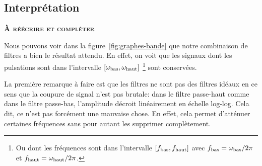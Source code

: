 \subsection{Interprétation}

\textbf{\textsc{À réécrire et compléter}}

Nous pouvons voir dans la figure~\ref{fig:graphes-bande}
que notre combinaison de filtres a bien le résultat attendu.
En effet, on voit que les signaux dont les pulsations sont dans l'intervalle
$[\omega_{\mathrm{bas}},\omega_{\mathrm{haut}}]$
\footnote{Ou dont les fréquences sont dans l'intervalle
    $[f_{\mathrm{bas}},f_{\mathrm{haut}}]$ avec
    $f_{\mathrm{bas}} = \omega_{\mathrm{bas}}/2\pi$ et
    $f_{\mathrm{haut}} = \omega_{\mathrm{haut}}/2\pi$.}
sont conservées.

La première remarque à faire est que les filtres ne sont pas des filtres idéaux
en ce sens que la coupure de signal n'est pas brutale:
dans le filtre passe-haut comme dans le filtre passe-bas,
l'amplitude décroit linéairement en échelle log-log.
Cela dit, ce n'est pas forcément une mauvaise chose.
En effet, cela permet d'atténuer certaines fréquences sans pour autant
les supprimer complètement.
